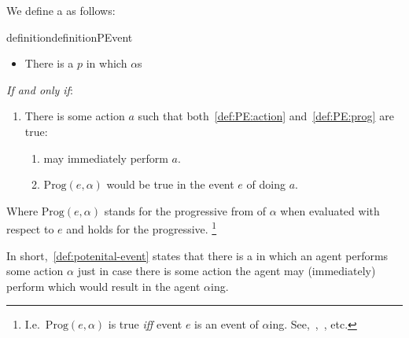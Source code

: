 \begin{note}
  We define a \pevent{} as follows:
  \begin{restatable}[\pevent{3}]{definition}{definitionPEvent}
    \label{def:potenital-event}

    \begin{itemize}
    \item
      There is a \pevent{} \(p\) in which \vAgent{} \(\alpha\)s
    \end{itemize}

    \emph{If and only if}:

    \begin{enumerate}[label=]
    \item
      There is some action \(a\) such that both~\ref{def:PE:action} and~\ref{def:PE:prog} are true:
      \begin{enumerate}[label=\alph*., ref=(\alph*)]
      \item
        \label{def:PE:action}
        \vAgent{} may immediately perform \(a\).
      \item
        \label{def:PE:prog}
        \(\text{Prog}(e, \alpha)\) would be true in the event \(e\) of \vAgent{} doing \(a\).
      \end{enumerate}
    \end{enumerate}

    Where \(\text{Prog}(e, \alpha)\) stands for the progressive from of \(\alpha\) when evaluated with respect to \(e\) and \assuPP{} holds for the progressive.%
    \footnote{
      I.e.\ \(\text{Prog}(e, \alpha)\) is true \emph{iff} event \(e\) is an event of \(\alpha\)ing.
      See,~\textcite{Richards:1981wo},~\textcite{Portner:2011vi}, etc.
    }
  \end{restatable}

  In short,~\autoref{def:potenital-event} states that there is a \pevent{} in which an agent performs some action \(\alpha\) just in case there is some action the agent may (immediately) perform which would result in the agent \(\alpha\)ing.
\end{note}

